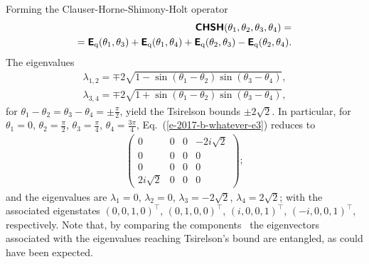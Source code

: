 Forming the Clauser-Horne-Shimony-Holt operator
\begin{equation}
\begin{split}
\textsf{\textbf{CHSH}}( \theta_1, \theta_2,  \theta_3, \theta_4)=\\=
\textsf{\textbf{E}}_{\text{q}} ( \theta_1, \theta_3) +
\textsf{\textbf{E}}_{\text{q}} ( \theta_1, \theta_4) +
\textsf{\textbf{E}}_{\text{q}} ( \theta_2, \theta_3 ) -
\textsf{\textbf{E}}_{\text{q}} ( \theta_2, \theta_4)
.
\end{split}
\label{e-2017-b-whatever-e3}
\end{equation}
The eigenvalues
\begin{equation}
\begin{split}
\lambda_{1,2} = \mp 2 \sqrt{1 - \sin (\theta_1-\theta_2) \sin (\theta_3-\theta_4)},     \\
\lambda_{3,4} = \mp 2 \sqrt{1 + \sin (\theta_1-\theta_2) \sin (\theta_3-\theta_4)}
,
\end{split}
\label{e-2017-b-whatever-e4}
\end{equation}
for $\theta_1-\theta_2= \theta_3-\theta_4 =\pm \frac{\pi}{2}$, yield  the Tsirelson bounds $\pm 2\sqrt{2}$.
In particular, for
$\theta_1=0$,
$\theta_2= \frac{\pi}{2}$,
$\theta_3=\frac{\pi}{4}$,
$\theta_4 = \frac{3\pi}{4}$,
Eq.~(\ref{e-2017-b-whatever-e3})
reduces to
\begin{equation}
\begin{split}
\begin{pmatrix}
0 & 0 & 0 & -2 i \sqrt{2} \\
 0 & 0 & 0 & 0 \\
 0 & 0 & 0 & 0 \\
 2 i \sqrt{2} & 0 & 0 & 0
\end{pmatrix}  ;
\end{split}
\label{e-2017-b-whatever-e5}
\end{equation}
and the eigenvalues are
$\lambda_1 =0$,
$\lambda_2 = 0$,
$\lambda_3 = -2 \sqrt{2}$,
$\lambda_4 = 2 \sqrt{2}$;
with the associated eigenstates
$\left( 0, 0, 1, 0\right)^\intercal$,
$\left( 0, 1, 0, 0\right)^\intercal$,
$\left( i, 0, 0, 1\right)^\intercal$,
$\left( -i, 0, 0, 1\right)^\intercal$,
respectively.
Note that, by comparing the components~\cite[p.~18]{mermin-07} the eigenvectors associated with the eigenvalues reaching Tsirelson's bound are entangled,
as could have been expected.

